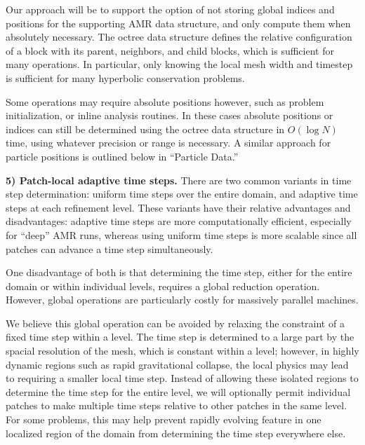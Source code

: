 \documentclass[10pt,twocolumn]{article}
\begin{document}
Our approach will be to support the option of not storing global
indices and positions for the supporting AMR data structure, and only
compute them when absolutely necessary.  The octree data structure
defines the relative configuration of a block with its parent,
neighbors, and child blocks, which is sufficient for many operations.
In particular, only knowing the local mesh width and timestep is
sufficient for many hyperbolic conservation problems.

Some operations may require absolute positions however, such as
problem initialization, or inline analysis routines.  In these cases
absolute positions or indices can still be determined using the octree
data structure in $O(\log N)$ time, using whatever precision or range
is necessary.  A similar approach for particle positions is outlined
below in ``Particle Data.''



\textbf{5) Patch-local adaptive time steps.} There are two common
variants in time step determination: uniform time steps over the
entire domain, and adaptive time steps at each refinement level.
These variants have their relative advantages and disadvantages:
adaptive time steps are more computationally efficient, especially for
``deep'' AMR runs, whereas using uniform time steps is more scalable
since all patches can advance a time step simultaneously.

One disadvantage of both is that determining the time step, either for
the entire domain or within individual levels, requires a global
reduction operation.  However, global operations are particularly
costly for massively parallel machines.

We believe this global operation can be avoided by relaxing the
constraint of a fixed time step within a level.  The time step is
determined to a large part by the spacial resolution of the mesh,
which is constant within a level; however, in highly dynamic regions
such as rapid gravitational collapse, the local physics may lead to
requiring a smaller local time step.  Instead of allowing these
isolated regions to determine the time step for the entire level, we
will optionally permit individual patches to make multiple time steps
relative to other patches in the same level.  For some problems, this
may help prevent rapidly evolving feature in one localized region of
the domain from determining the time step everywhere else.

\end{document}
